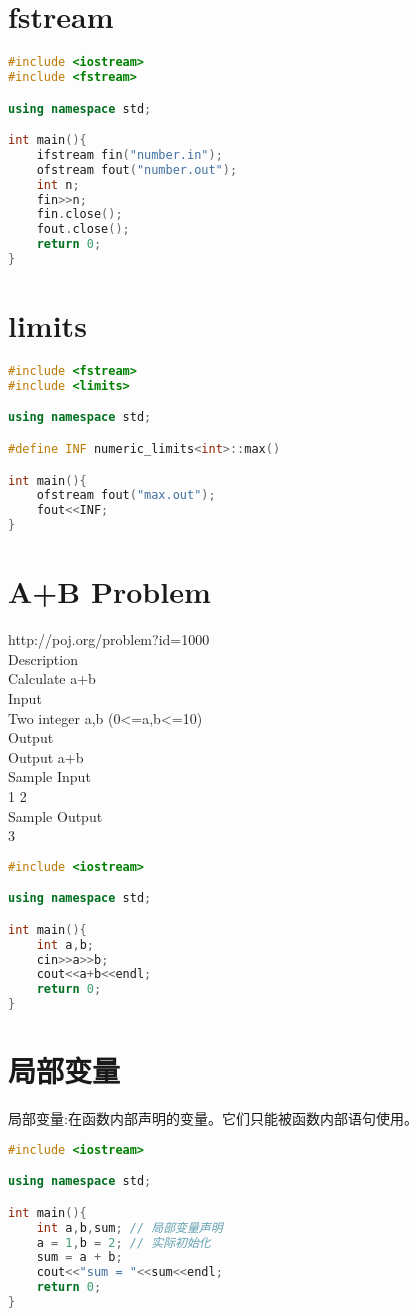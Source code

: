 \documentclass[12pt,twiside,a4paper]{ctexbook}
\numberwithin{chapter}{part}
\begin{document}
\section{fstream}
\begin{lstlisting}[language=C++]
#include <iostream>
#include <fstream>

using namespace std;

int main(){
	ifstream fin("number.in");
	ofstream fout("number.out");
	int n;
	fin>>n;
	fin.close();
	fout.close();
	return 0;
}
\end{lstlisting}
\section{limits}
\begin{lstlisting}[language=C++]
#include <fstream>
#include <limits>

using namespace std;

#define INF numeric_limits<int>::max()

int main(){
	ofstream fout("max.out");
	fout<<INF;
}
\end{lstlisting}

\section{A+B Problem}
http://poj.org/problem?id=1000\\
Description\\
Calculate a+b\\
Input\\
Two integer a,b (0<=a,b<=10)\\
Output\\
Output a+b\\
Sample Input\\
1 2\\
Sample Output\\
3
\begin{lstlisting}[language=C++]
#include <iostream>

using namespace std;

int main(){
	int a,b;
	cin>>a>>b;
	cout<<a+b<<endl;
	return 0;
}
\end{lstlisting}
\section{局部变量}
局部变量:在函数内部声明的变量。它们只能被函数内部语句使用。
\begin{lstlisting}[language=C++]
#include <iostream>

using namespace std;

int main(){
	int a,b,sum; // 局部变量声明
	a = 1,b = 2; // 实际初始化
	sum = a + b;
	cout<<"sum = "<<sum<<endl;
	return 0;
}
\end{lstlisting}
\end{document}
